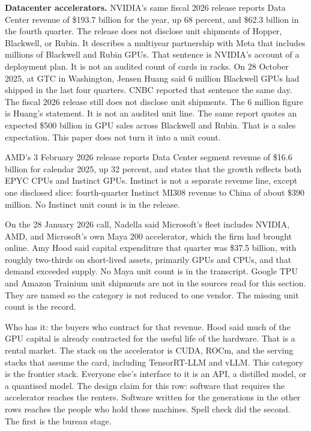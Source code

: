 \documentclass[
  10pt,
]{article}
\begin{document}
\textbf{Datacenter accelerators.} NVIDIA's same fiscal 2026 release
reports Data Center revenue of \$193.7 billion for the year, up 68
percent, and \$62.3 billion in the fourth quarter. The release does not
disclose unit shipments of Hopper, Blackwell, or Rubin. It describes a
multiyear partnership with Meta that includes millions of Blackwell and
Rubin GPUs. That sentence is NVIDIA's account of a deployment plan. It
is not an audited count of cards in racks. On 28 October 2025, at GTC in
Washington, Jensen Huang said 6 million Blackwell GPUs had shipped in
the last four quarters. CNBC reported that sentence the same day. The
fiscal 2026 release still does not disclose unit shipments. The 6
million figure is Huang's statement. It is not an audited unit line. The
same report quotes an expected \$500 billion in GPU sales across
Blackwell and Rubin. That is a sales expectation. This paper does not
turn it into a unit count.

AMD's 3 February 2026 release reports Data Center segment revenue of
\$16.6 billion for calendar 2025, up 32 percent, and states that the
growth reflects both EPYC CPUs and Instinct GPUs. Instinct is not a
separate revenue line, except one disclosed slice: fourth-quarter
Instinct MI308 revenue to China of about \$390 million. No Instinct unit
count is in the release.

On the 28 January 2026 call, Nadella said Microsoft's fleet includes
NVIDIA, AMD, and Microsoft's own Maya 200 accelerator, which the firm
had brought online. Amy Hood said capital expenditure that quarter was
\$37.5 billion, with roughly two-thirds on short-lived assets, primarily
GPUs and CPUs, and that demand exceeded supply. No Maya unit count is in
the transcript. Google TPU and Amazon Trainium unit shipments are not in
the sources read for this section. They are named so the category is not
reduced to one vendor. The missing unit count is the record.

Who has it: the buyers who contract for that revenue. Hood said much of
the GPU capital is already contracted for the useful life of the
hardware. That is a rental market. The stack on the accelerator is CUDA,
ROCm, and the serving stacks that assume the card, including
TensorRT-LLM and vLLM. This category is the frontier stack. Everyone
else's interface to it is an API, a distilled model, or a quantised
model. The design claim for this row: software that requires the
accelerator reaches the renters. Software written for the generations in
the other rows reaches the people who hold those machines. Spell check
did the second. The first is the bureau stage.
\end{document}

